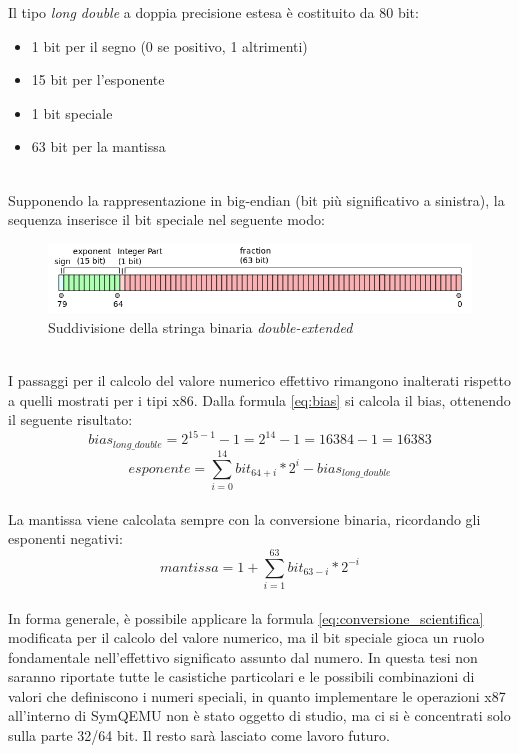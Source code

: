 \documentclass[Lau, oneside]{sapthesis}%
\begin{document}
\newpage
Il tipo \textit{long double} a doppia precisione estesa è costituito da 80 bit:
\begin{itemize}
    \item 1 bit per il segno (0 se positivo, 1 altrimenti)
    \item 15 bit per l'esponente
    \item 1 bit speciale
    \item 63 bit per la mantissa
\end{itemize}
\ \\
Supponendo la rappresentazione in big-endian (bit più significativo a sinistra), la sequenza inserisce il bit speciale nel seguente modo:
\newline
\begin{figure}[h]
\centering
\includegraphics[scale=0.5]{foto/80_bit.png}
\caption{Suddivisione della stringa binaria \textit{double-extended} \cite{ref:80_bit}}
\end{figure}
\ \\ \newline
I passaggi per il calcolo del valore numerico effettivo rimangono inalterati rispetto a quelli mostrati per i tipi x86.
\newline \newline
Dalla formula \eqref{eq:bias} si calcola il bias, ottenendo il seguente risultato:
\ \\
\begin{equation}
    bias_{long\_double} = 2^{15-1}-1 = 2^{14}-1 = 16384-1 = 16383
\end{equation}
\begin{equation}
   esponente = \sum_{i=0}^{14} bit_{64+i}*2^{i} - bias_{long\_double}
\end{equation}
\ \\
\newline
La mantissa viene calcolata sempre con la conversione binaria, ricordando gli esponenti negativi:
\ \\
\begin{equation}
    mantissa = 1 + \sum_{i=1}^{63} bit_{63-i}*2^{-i} 
\end{equation}
\ \\
\newline \newline
In forma generale, è possibile applicare la formula \eqref{eq:conversione_scientifica} modificata per il calcolo del valore numerico, ma il bit speciale gioca un ruolo fondamentale nell'effettivo significato assunto dal numero.
\newline \newline
In questa tesi non saranno riportate tutte le casistiche particolari e le possibili combinazioni di valori che definiscono i numeri speciali, in quanto implementare le operazioni x87 all'interno di SymQEMU non è stato oggetto di studio, ma ci si è concentrati solo sulla parte 32/64 bit. Il resto sarà lasciato come lavoro futuro.
\end{document}
